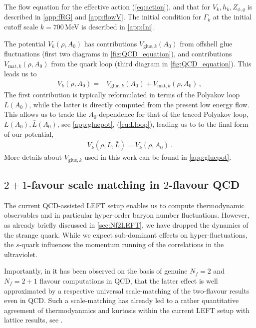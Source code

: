 \documentclass[%
reprint,
superscriptaddress,
showpacs,preprintnumbers,
amsmath,amssymb,
aps,
prd,
]{revtex4-1}
\def\eq#1{(\ref{#1})}
\begin{document}
The flow equation for the effective action \eq{eq:action}, and that for $V_k, h_k, Z_{\phi,q}$ is described in \autoref{app:fRG} and \autoref{app:flowV}. The initial condition for $\Gamma_k$ at the initial cutoff scale $k=700$\,MeV is described in \autoref{app:Ini}. 
	
The potential $V_k(\rho, A_0)$ has contributions $V_{\mathrm{glue},k}(A_0)$ from offshell glue fluctuations (first two diagrams in \autoref{fig:QCD_equation}), and contributions $V_{\mathrm{mat},k}(\rho,A_0)$ from the quark loop (third diagram in \autoref{fig:QCD_equation}). This leads us to 
%
\begin{align}
V_k(\rho,A_0)=&V_{\mathrm{glue},k}(A_0)+V_{\mathrm{mat},k}(\rho,A_0)\,,\label{eq:Vtotal}
\end{align}
%
The first contribution is typically reformulated in terms of the Polyakov loop $L(A_0)$, while the latter is directly computed from the present low energy flow. This allows us to trade the $A_0$-dependence for that of the traced Polyakov loop, $L(A_0), \bar L(A_0)$, see \autoref{app:gluepot}, \eq{eq:Lloop}, leading us to to the final form of our potential, 
%
\begin{align}
V_k(\rho, L,\bar L)= V_k(\rho, A_0)\,. 
\end{align}
More details about $V_{\mathrm{glue},k}$ used in this work can be found in \autoref{app:gluepot}. 
	
\subsection{$2+1$-favour scale matching in $2$-flavour QCD}\label{subsec:scale}
	
The current QCD-assisted LEFT setup enables us to compute thermodynamic observables and in particular hyper-order baryon number fluctuations. However, as already briefly discussed in \autoref{sec:Nf2LEFT}, we have dropped the dynamics of the strange quark. While we expect sub-dominant effects on hyper-fluctuations, the $s$-quark influences the momentum running of the correlations in the ultraviolet. 
	
Importantly, in \cite{Fu:2019hdw} it has been observed on the basis of genuine $N_f=2$ and $N_f=2+1$ flavour computations in QCD, that the latter effect is well approximated by a respective universal scale-matching of the two-flavour results even in QCD. Such a scale-matching has already led to a rather quantitative agreement of thermodyanmics and kurtosis within the current LEFT setup with lattice results, see \cite{Fu:2015amv, Fu:2015naa, Fu:2016tey}. 
	
\end{document}

